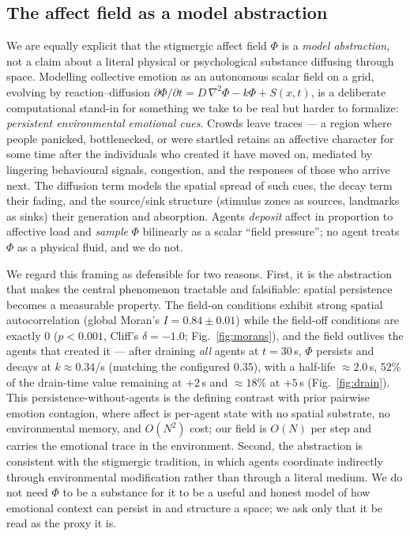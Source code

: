\documentclass[sigconf,nonacm]{acmart}
\begin{document}
\subsection{The affect field as a model abstraction}

We are equally explicit that the stigmergic affect field $\Phi$ is a \emph{model abstraction}, not a claim about a literal physical or psychological substance diffusing through space. Modelling collective emotion as an autonomous scalar field on a grid, evolving by reaction--diffusion $\partial\Phi/\partial t = D\,\nabla^2\Phi - k\Phi + S(x,t)$, is a deliberate computational stand-in for something we take to be real but harder to formalize: \emph{persistent environmental emotional cues}. Crowds leave traces --- a region where people panicked, bottlenecked, or were startled retains an affective character for some time after the individuals who created it have moved on, mediated by lingering behavioural signals, congestion, and the responses of those who arrive next. The diffusion term models the spatial spread of such cues, the decay term their fading, and the source/sink structure (stimulus zones as sources, landmarks as sinks) their generation and absorption. Agents \emph{deposit} affect in proportion to affective load and \emph{sample} $\Phi$ bilinearly as a scalar ``field pressure''; no agent treats $\Phi$ as a physical fluid, and we do not.

We regard this framing as defensible for two reasons. First, it is the abstraction that makes the central phenomenon tractable and falsifiable: spatial persistence becomes a measurable property. The field-on conditions exhibit strong spatial autocorrelation (global Moran's $I = 0.84 \pm 0.01$) while the field-off conditions are exactly $0$ ($p < 0.001$, Cliff's $\delta = -1.0$; Fig.~\ref{fig:morans}), and the field outlives the agents that created it --- after draining \emph{all} agents at $t = 30$\,s, $\Phi$ persists and decays at $k \approx 0.34$/s (matching the configured $0.35$), with a half-life $\approx 2.0$\,s, $52\%$ of the drain-time value remaining at $+2$\,s and $\approx 18\%$ at $+5$\,s (Fig.~\ref{fig:drain}). This persistence-without-agents is the defining contrast with prior pairwise emotion contagion, where affect is per-agent state with no spatial substrate, no environmental memory, and $O(N^2)$ cost; our field is $O(N)$ per step and carries the emotional trace in the environment. Second, the abstraction is consistent with the stigmergic tradition, in which agents coordinate indirectly through environmental modification rather than through a literal medium. We do not need $\Phi$ to be a substance for it to be a useful and honest model of how emotional context can persist in and structure a space; we ask only that it be read as the proxy it is.
\end{document}
